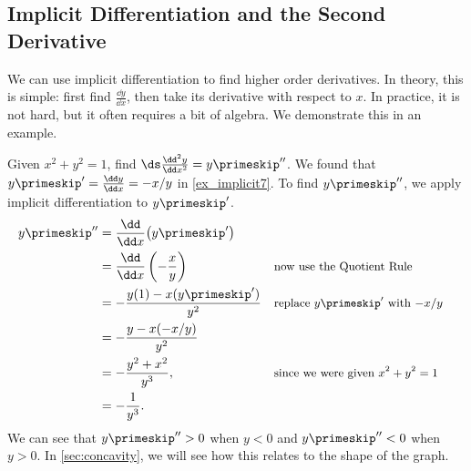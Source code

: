 %
%
%

\subsection{Implicit Differentiation and the Second Derivative}

We can use implicit differentiation to find higher order derivatives. In theory, this is simple: first find $\frac{\dd y}{\dd x}$, then take its derivative with respect to $x$. In practice, it is not hard, but it often requires a bit of algebra. We demonstrate this in an example.

\begin{example}\label{ex_implicit9}%
Given $x^2+y^2=1$, find $\ds\frac{\dd^2y}{\dd x^2} = y\primeskip''$.
\solution
We found that $y\primeskip' = \frac{\dd y}{\dd x} = -x/y$ in \autoref{ex_implicit7}. To find $y\primeskip''$, we apply implicit differentiation to $y\primeskip'$.
{\allowdisplaybreaks
\begin{align*}
	y\primeskip''
	&= \frac{\dd}{\dd x}\bigl(y\primeskip'\bigr) \\
	&= \frac{\dd}{\dd x}\left(-\frac xy\right) && \text{\small now use the Quotient Rule} \\
	&= -\frac{y(1) - x(y\primeskip')}{y^2} && \text{\small replace $y\primeskip'$ with $-x/y$} \\
	&= -\frac{y-x(-x/y)}{y^2}\\
	&= -\frac{y^2+x^2}{y^3}, && \text{\small since we were given $x^2+y^2=1$} \\
	&= -\frac1{y^3}.
\end{align*}}
We can see that $y\primeskip''>0$ when $y<0$ and $y\primeskip''<0$ when $y>0$. In \autoref{sec:concavity}, we will see how this relates to the shape of the graph.
\end{example}

